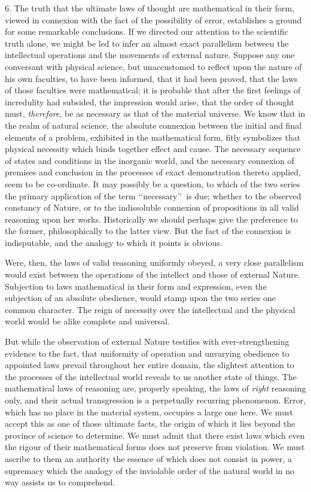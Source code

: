 \documentclass[oneside]{book}
\begin{document}
6. The truth that the ultimate laws of thought are mathematical in their form, viewed in connexion with the fact of the
possibility of error, establishes a ground for some remarkable conclusions. If we directed our attention to the scientific truth
alone, we might be led to infer an almost exact parallelism between the intellectual operations and the movements of external
nature. Suppose any one conversant with physical science, but
unaccustomed to reflect upon the nature of his own faculties, to
have been informed, that it had been proved, that the laws of
those faculties were mathematical; it is probable that after the
first feelings of incredulity had subsided, the impression would
arise, that the order of thought must, \emph{therefore}, be as necessary as that of the material universe. We know that in the
realm of natural science, the absolute connexion between the
initial and final elements of a problem, exhibited in the mathematical form, fitly symbolizes that physical necessity which binds
together effect and cause. The necessary sequence of states and
conditions in the inorganic world, and the necessary connexion
of premises and conclusion in the processes of exact demonstration thereto applied, seem to be co-ordinate. It may possibly be
a question, to which of the two series the primary application of
the term \lq\lq necessary\rq\rq\ is due; whether to the observed constancy of
Nature, or to the indissoluble connexion of propositions in all valid
reasoning upon her works. Historically we should perhaps give
the preference to the former, philosophically to the latter view.
But the fact of the connexion is indisputable, and the analogy to
which it points is obvious.

Were, then, the laws of valid reasoning uniformly obeyed, a
very close parallelism would exist between the operations of the
intellect and those of external Nature. Subjection to laws mathematical
in their form and expression, even the subjection of
an absolute obedience, would stamp upon the two series one
common character. The reign of necessity over the intellectual
and the physical world would be alike complete and universal.

But while the observation of external Nature testifies with
ever-strengthening evidence to the fact, that uniformity of
operation and unvarying obedience to appointed laws prevail
throughout her entire domain, the slightest attention to the processes
of the intellectual world reveals to us another state of
things. The mathematical laws of reasoning are, properly speaking,
the laws of \emph{right} reasoning only, and their actual transgression
is a perpetually recurring phenomenon. Error, which has
no place in the material system, occupies a large one here. We
must accept this as one of those ultimate facts, the origin of which
it lies beyond the province of science to determine. We must
admit that there exist laws which even the rigour of their mathematical
forms does not preserve from violation. We must
ascribe to them an authority the essence of which does not consist
in power, a supremacy which the analogy of the inviolable
order of the natural world in no way assists us to comprehend.
\end{document}
